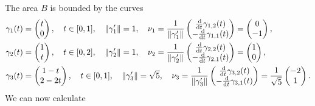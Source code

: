 \documentclass{exercise}
\begin{document}
	The area \(B\) is bounded by the curves
	\begin{align*}
		\gamma_1\parentheses*{t} &= \begin{pmatrix}
			t\\
			0
		\end{pmatrix}, \quad t \in \brackets*{0, 1}, \quad \norm*{\gamma_1'} = 1, \quad \nu_1 = \frac{1}{\norm{\gamma_1'}}\begin{pmatrix}
			\frac{\d}{\d t}\gamma_{1, 2}\parentheses*{t}\\
			-\frac{\d}{\d t}\gamma_{1, 1}\parentheses*{t}
		\end{pmatrix} = \begin{pmatrix}
			0\\
			-1
		\end{pmatrix},\\
		\gamma_2\parentheses*{t} &= \begin{pmatrix}
			1\\
			t
		\end{pmatrix}, \quad t \in \brackets*{0, 2}, \quad \norm*{\gamma_2'} = 1, \quad \nu_2 = \frac{1}{\norm{\gamma_2'}}\begin{pmatrix}
			\frac{\d}{\d t}\gamma_{2, 2}\parentheses*{t}\\
			-\frac{\d}{\d t}\gamma_{2, 1}\parentheses*{t}
		\end{pmatrix} = \begin{pmatrix}
			1\\
			0
		\end{pmatrix},\\
		\gamma_3\parentheses*{t} &= \begin{pmatrix}
			1 - t\\
			2 - 2t
		\end{pmatrix}, \quad t \in \brackets*{0, 1}, \quad \norm*{\gamma_3'} = \sqrt{5}, \quad \nu_3 = \frac{1}{\norm*{\gamma_3'}}\begin{pmatrix}
			\frac{\d}{\d t}\gamma_{3, 2}\parentheses*{t}\\
			-\frac{\d}{\d t}\gamma_{3, 1}\parentheses*{t}
		\end{pmatrix} = \frac{1}{\sqrt{5}}\begin{pmatrix}
			-2\\
			1
		\end{pmatrix}.
	\end{align*}
	We can now calculate
\end{document}
